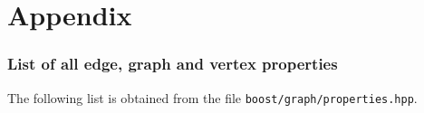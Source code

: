 \chapter{Appendix}

\subsection{List of all edge, graph and vertex properties}
\label{subsec:all_properties}

The following list is obtained from the file \verb;boost/graph/properties.hpp;.

